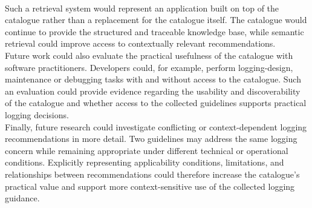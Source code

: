 \\
Such a retrieval system would represent an application built on top of the catalogue
rather than a replacement for the catalogue itself. The catalogue would continue to
provide the structured and traceable knowledge base, while semantic retrieval could
improve access to contextually relevant recommendations.
\\
Future work could also evaluate the practical usefulness of the catalogue with
software practitioners. Developers could, for example, perform logging-design,
maintenance or debugging tasks with and without access to the catalogue. Such an
evaluation could provide evidence regarding the usability and discoverability of the
catalogue and whether access to the collected guidelines supports practical logging
decisions.
\\
Finally, future research could investigate conflicting or context-dependent logging
recommendations in more detail. Two guidelines may address the same logging concern
while remaining appropriate under different technical or operational conditions.
Explicitly representing applicability conditions, limitations, and relationships
between recommendations could therefore increase the catalogue's practical value
and support more context-sensitive use of the collected logging guidance.

